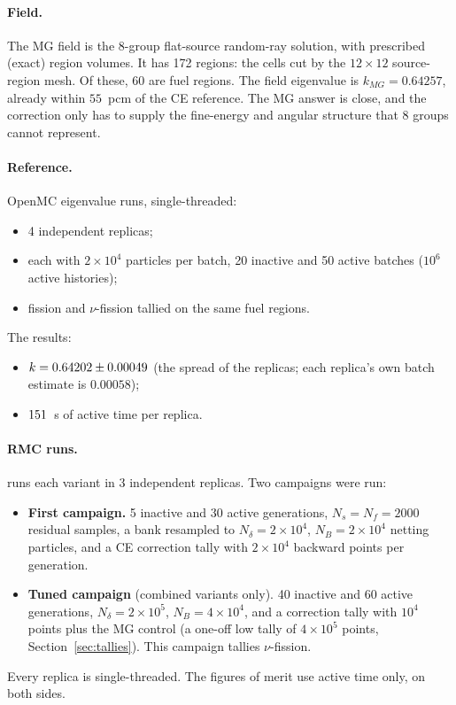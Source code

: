 \paragraph{Field.} The MG field is the 8-group flat-source random-ray solution, with prescribed
(exact) region volumes. It has 172 regions: the cells cut by the $12\times12$ source-region mesh. Of
these, 60 are fuel regions. The field eigenvalue is $k_{MG}=0.64257$, already within $55$~pcm of
the CE reference. The MG answer is close, and the correction only has to supply the fine-energy and
angular structure that 8 groups cannot represent.

\paragraph{Reference.} OpenMC eigenvalue runs, single-threaded:
\begin{itemize}
\item 4 independent replicas;
\item each with $2\times10^4$ particles per batch, 20 inactive and 50 active batches ($10^6$ active histories);
\item fission and $\nu$-fission tallied on the same fuel regions.
\end{itemize}
The results:
\begin{itemize}
\item $k=0.64202\pm0.00049$ (the spread of the replicas; each replica's own batch estimate is $0.00058$);
\item $151$~s of active time per replica.
\end{itemize}

\paragraph{RMC runs.}  runs each variant in 3 independent replicas. Two
campaigns were run:
\begin{itemize}
\item \textbf{First campaign.} 5 inactive and 30 active generations, $N_s=N_f=2000$ residual samples,
  a bank resampled to $N_\delta=2\times10^4$, $N_B=2\times10^4$ netting particles, and a CE
  correction tally with $2\times10^4$ backward points per generation.
\item \textbf{Tuned campaign} (combined variants only). 40 inactive and 60 active generations,
  $N_\delta=2\times10^5$, $N_B=4\times10^4$, and a correction tally with $10^4$ points plus the MG
  control (a one-off low tally of $4\times10^5$ points, Section~\ref{sec:tallies}). This campaign
  tallies $\nu$-fission.
\end{itemize}
Every replica is single-threaded. The figures of merit use active time only, on both sides.

